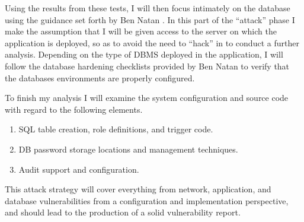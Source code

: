 \documentclass{sig-alternate}
\begin{document}
Using the results from these tests, I will then focus intimately on the database using the guidance set forth by 
Ben Natan \cite{ben2005-SDS}. In this part of the ``attack'' phase I make the assumption that I will be given access to the 
server on which the application is deployed, so as to avoid the need to ``hack'' in to conduct a further analysis. 
Depending on the type of DBMS deployed in the application, I will follow the database hardening checklists 
provided by Ben Natan to verify that the databases environments are properly configured. 

To finish my analysis I will examine the system configuration and source code with regard to the following elements.

\begin{enumerate}
	\item SQL table creation, role definitions, and trigger code.
	\item DB password storage locations and management techniques.
	\item Audit support and configuration.
\end{enumerate}

This attack strategy will cover everything from network, application, and database vulnerabilities from a configuration
and implementation perspective, and should lead to the production of a solid vulnerability report. 

\balance
\end{document}

